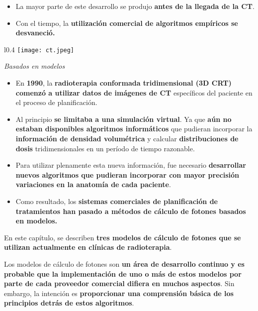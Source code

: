 \documentclass[aspectratio=169,xcolor=dvipsnames,t]{beamer}
\begin{document}
\begin{frame}
    
    \begin{itemize}
        \item La mayor parte de este desarrollo se produjo \textbf{antes de la llegada de la CT}.
        \item Con el tiempo, la \textbf{utilización comercial de algoritmos empíricos se desvaneció.}
    \end{itemize}

    \begin{wrapfigure}{l}{0.4\textwidth}
        \centering
        \texttt{[image: ct.jpeg]}
    \end{wrapfigure}

    \textit{Basados en modelos}

    \begin{itemize}
        \item En \textbf{1990}, la \textbf{radioterapia conformada tridimensional (3D CRT) comenzó a utilizar datos de imágenes de CT} específicos del paciente en el proceso de planificación.
        \item Al principio \textbf{se limitaba a una simulación virtual}. Ya que \textbf{aún no estaban disponibles algoritmos informáticos} que pudieran incorporar la \textbf{información de densidad volumétrica} y calcular \textbf{distribuciones de dosis} tridimensionales en un período de tiempo razonable.
    \end{itemize}
\end{frame}

\begin{frame}

    \vspace{0.6cm}

    \begin{itemize}
        \item Para utilizar plenamente esta nueva información, fue necesario \textbf{desarrollar nuevos algoritmos que pudieran incorporar con mayor precisión variaciones en la anatomía de cada paciente}.
        \item Como resultado, los \textbf{sistemas comerciales de planificación de tratamientos han pasado a métodos de cálculo de fotones basados en modelos.}
    \end{itemize}

    \vspace{5pt}

    En este capítulo, se describen \textbf{tres modelos de cálculo de fotones que se utilizan actualmente en clínicas de radioterapia}. 
    
    Los modelos de cálculo de fotones son \textbf{un área de desarrollo continuo y es probable que la implementación de uno o más de estos modelos por parte de cada proveedor comercial difiera en muchos aspectos}. Sin embargo, la intención es \textbf{proporcionar una comprensión básica de los principios detrás de estos algoritmos}.

\end{frame}
\end{document}
